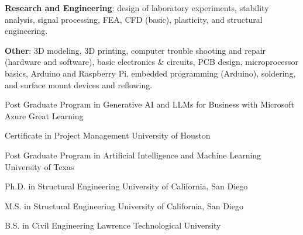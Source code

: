 \documentclass{leresume}
\begin{document}
\begin{bulletedlist}
		\item \textbf{Research and Engineering}: design of laboratory experiments,
                        stability analysis,
                        signal processing,
                        FEA,
                        CFD (basic),
                        plasticity,
                        and structural engineering.
                        
		\item \textbf{Other}: 3D modeling,
                        3D printing,
                        computer trouble shooting and repair (hardware and software),
                        basic electronics \& circuits,
                        PCB design,
                        microprocessor basics,
                        Arduino and Raspberry Pi,
                        embedded programming (Arduino),
                        soldering,
                        and surface mount devices and reflowing.
                        
	\end{bulletedlist}

	
                {Post Graduate Program in Generative AI and LLMs for Business with Microsoft Azure}
                {Great Learning}
		
                {Certificate in Project Management}
                {University of Houston}
		
                {Post Graduate Program in Artificial Intelligence and Machine Learning}
                {University of Texas}
		

	
                {Ph.D. in Structural Engineering}
                {University of California, San Diego}
		
                {M.S. in Structural Engineering}
                {University of California, San Diego}
		
                {B.S. in Civil Engineering}
                {Lawrence Technological University}
		

    
\end{document}
